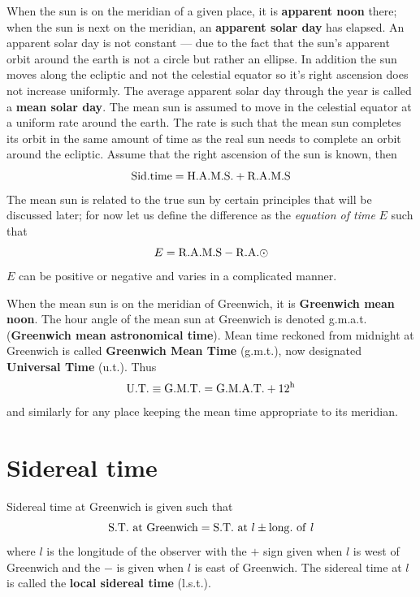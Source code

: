When the sun is on the meridian of a given place, it is \textbf{apparent
noon} there; when the sun is next on the meridian, an {\bf apparent
  solar day} has elapsed. An apparent solar day is not constant --- due
to the fact that the sun's apparent orbit around the earth is not a
circle but rather an ellipse. In addition the sun moves along the
ecliptic and not the celestial equator so it's right ascension does
not increase uniformly. The average apparent solar day through the
year is called a {\bf mean solar day}. The mean sun is assumed to
move in the celestial equator at a uniform rate around the
earth. The rate is such that the mean sun completes its orbit in the
same amount of time as the real sun needs to complete an orbit around
the ecliptic. Assume that the right ascension of the sun is known,
then 
\[
{\rm Sid. time}={\rm H.A.M.S.}+{\rm R.A.M.S}
\]
The mean sun is related to the true sun by certain principles that
will be discussed later; for now let us define the difference as the
{\it equation of time} $E$ such that
\[
E={\rm R.A.M.S-R.A.\astrosun}
\]
$E$ can be positive or negative and varies in a complicated manner. 

When the mean sun is on the meridian of Greenwich, it is {\bf Greenwich
  mean noon}. The hour angle of the mean sun at Greenwich is denoted
	{\sc g.m.a.t.} (\textbf{Greenwich mean astronomical time}). 
Mean time reckoned from midnight at Greenwich is called
{\bf Greenwich Mean Time} ({\sc g.m.t.}), now designated {\bf
  Universal Time} ({\sc u.t.}). Thus
\[
	{\rm U.T.}\equiv{\rm G.M.T.}={\rm G.M.A.T.}+12^{\mathrm{h}}
\]
and similarly for any place keeping the mean time appropriate to its
meridian. 

\section{Sidereal time}

Sidereal time at Greenwich is given such that
\[
{\rm S.T.~at~Greenwich}={\rm S.T.~at}~l\pm{\rm long.~of~}l
\]
where $l$ is the longitude of the observer with the $+$ sign given
when $l$ is west of Greenwich and the $-$ is given when $l$ is east of
Greenwich. The sidereal time at $l$ is called the {\bf local sidereal
  time} ({\sc l.s.t.}).

